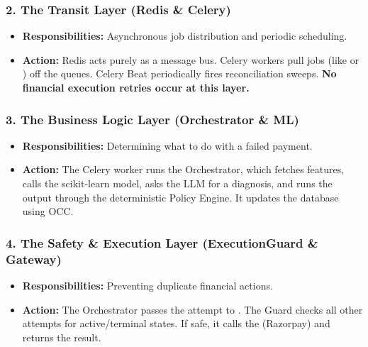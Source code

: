 \vspace{0.4cm}

\subsubsection{2. The Transit Layer (Redis \& Celery)}
\begin{itemize}
    \item \textbf{Responsibilities:} Asynchronous job distribution and periodic scheduling.
    \item \textbf{Action:} Redis acts purely as a message bus. Celery workers pull jobs (like  or ) off the queues. Celery Beat periodically fires reconciliation sweeps. \textbf{No financial execution retries occur at this layer.}
\end{itemize}

\vspace{0.4cm}

\subsubsection{3. The Business Logic Layer (Orchestrator \& ML)}
\begin{itemize}
    \item \textbf{Responsibilities:} Determining what to do with a failed payment.
    \item \textbf{Action:} The Celery worker runs the Orchestrator, which fetches features, calls the scikit-learn model, asks the LLM for a diagnosis, and runs the output through the deterministic Policy Engine. It updates the database using OCC.
\end{itemize}

\vspace{0.4cm}

\subsubsection{4. The Safety \& Execution Layer (ExecutionGuard \& Gateway)}
\begin{itemize}
    \item \textbf{Responsibilities:} Preventing duplicate financial actions.
    \item \textbf{Action:} The Orchestrator passes the  attempt to . The Guard checks all other attempts for active/terminal states. If safe, it calls the  (Razorpay) and returns the result.
\end{itemize}

